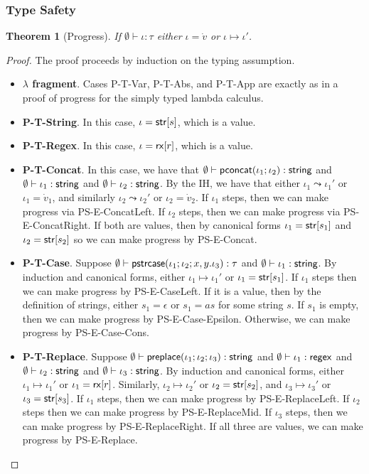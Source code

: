 \documentclass[11pt,leqno]{article}
\newtheorem{thm}{Theorem}
\theoremstyle{definition}
\renewcommand{\tstr}[1]{{{\sf str}[#1]}}
\newcommand{\preplace}[3]{{\sf preplace}(#1;#2;#3)}
\newcommand{\tconcat}[2]{{\sf pconcat}(#1;#2)} %
\newcommand{\rx}[1]{ {\sf rx}[#1] }
\newcommand{\str}{{\sf string}}
\newcommand{\regex}{{\sf regex}}
\newcommand{\pstrcase}[3]{ {\sf pstrcase}(#1; #2; #3)}
\begin{document}
\subsubsection{Type Safety}
\begin{thm}[Progress]
If $\emptyset\vdash \iota : \tau$ either $\iota = \dot{v}$ or $\iota \mapsto \iota'$.
\end{thm}
\begin{proof}
The proof proceeds by induction on the typing assumption. 
\begin{itemize}[label=$ $,itemsep=1ex]
\item \textbf{$\lambda$ fragment}. Cases P-T-Var, P-T-Abs, and P-T-App are exactly as in a proof of progress for
the simply typed lambda calculus.

\item \textbf{P-T-String}. In this case, $\iota = \tstr{s}$, which is a value.

\item \textbf{P-T-Regex}. In this case, $\iota = \rx{r}$, which is a value.

\item \textbf{P-T-Concat}. In this case, we have that $\emptyset \vdash \tconcat{\iota_1}{\iota_2} : \str$ and $\emptyset \vdash \iota_1 : \str$ and $\emptyset \vdash \iota_2 : \str$. By the IH, we have that either $\iota_1 \leadsto \iota_1'$ or $\iota_1 = \dot{v}_1$, and similarly $\iota_2 \leadsto \iota_2'$ or $\iota_2 = \dot{v}_2$. If $\iota_1$ steps, then we can make progress via PS-E-ConcatLeft. If $\iota_2$ steps, then we can make progress via PS-E-ConcatRight. If both are values, then by canonical forms $\iota_1 = \tstr{s_1}$ and $\iota_2 = \tstr{s_2}$ so we can make progress by PS-E-Concat.

\item \textbf{P-T-Case}.
Suppose $\emptyset \vdash \pstrcase{\iota_1}{\iota_2}{x,y.\iota_3} : \tau$ and $\emptyset \vdash \iota_1 : \str$. By induction and canonical forms, either $\iota_1 \mapsto \iota_1'$
or $\iota_1 = \tstr{s_1}$. 
If $\iota_1$ steps then we can make progress by PS-E-CaseLeft. If it is a value, then by the definition of strings, either $s_1 = \epsilon$ or $s_1 = as$ for some string $s$. If $s_1$ is empty, then we can make progress by PS-E-Case-Epsilon. Otherwise, we can make progress by PS-E-Case-Cons.

\item \textbf{P-T-Replace}.
Suppose $\emptyset \vdash \preplace{\iota_1}{\iota_2}{\iota_3} : \str$ and $\emptyset \vdash \iota_1 : \regex$ and $\emptyset \vdash \iota_2 : \str$ and $\emptyset \vdash \iota_3 : \str$. By induction and canonical forms, either $\iota_1 \mapsto \iota_1'$ or $\iota_1 = \rx{r}$. Similarly, $\iota_2 \mapsto \iota_2'$ or $\iota_2 = \tstr{s_2}$, and $\iota_3 \mapsto \iota_3'$ or $\iota_3 = \tstr{s_3}$. If $\iota_1$ steps, then we can make progress by PS-E-ReplaceLeft. If $\iota_2$ steps then we can make progress by PS-E-ReplaceMid. If $\iota_3$ steps, then we can make progress by PS-E-ReplaceRight. If all three are values, we can make progress by PS-E-Replace.


\end{itemize}
\end{proof}
\end{document}
